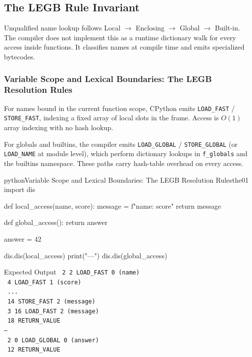 \subsection{The LEGB Rule Invariant}

Unqualified name lookup follows Local $\rightarrow$ Enclosing $\rightarrow$ Global $\rightarrow$ Built-in. The compiler does not implement this as a runtime dictionary walk for every access inside functions. It classifies names at compile time and emits specialized bytecodes.

\subsubsection{Variable Scope and Lexical Boundaries: The LEGB Resolution Rules}

For names bound in the current function scope, CPython emits \texttt{LOAD\_FAST} / \texttt{STORE\_FAST}, indexing a fixed array of local slots in the frame. Access is $O(1)$ array indexing with no hash lookup.

For globals and builtins, the compiler emits \texttt{LOAD\_GLOBAL} / \texttt{STORE\_GLOBAL} (or \texttt{LOAD\_NAME} at module level), which perform dictionary lookups in \texttt{f\_globals} and the builtins namespace. These paths carry hash-table overhead on every access.

\begin{codebox}[]{python}{Variable Scope and Lexical Boundaries: The LEGB Resolution Rules}{the01}
import dis

def local_access(name, score):
    message = f"{name}: {score}"
    return message

def global_access():
    return answer

answer = 42

dis.dis(local_access)
print("---")
dis.dis(global_access)
\end{codebox}


\begin{iobox}{Expected Output}
\texttt{  2           2 LOAD\_FAST                0 (name)} \\
\texttt{              4 LOAD\_FAST                1 (score)} \\
\texttt{             ...} \\
\texttt{             14 STORE\_FAST               2 (message)} \\
\texttt{  3          16 LOAD\_FAST                2 (message)} \\
\texttt{             18 RETURN\_VALUE} \\
\texttt{---} \\
\texttt{  2           0 LOAD\_GLOBAL              0 (answer)} \\
\texttt{             12 RETURN\_VALUE} \\
\end{iobox}




